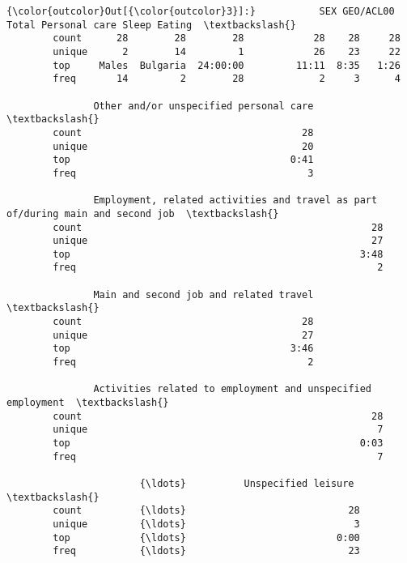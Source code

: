 \documentclass[11pt]{article}
\begin{document}
\begin{Verbatim}[commandchars=\\\{\}]
{\color{outcolor}Out[{\color{outcolor}3}]:}           SEX GEO/ACL00     Total Personal care Sleep Eating  \textbackslash{}
        count      28        28        28            28    28     28   
        unique      2        14         1            26    23     22   
        top     Males  Bulgaria  24:00:00         11:11  8:35   1:26   
        freq       14         2        28             2     3      4   
        
               Other and/or unspecified personal care  \textbackslash{}
        count                                      28   
        unique                                     20   
        top                                      0:41   
        freq                                        3   
        
               Employment, related activities and travel as part of/during main and second job  \textbackslash{}
        count                                                  28                                
        unique                                                 27                                
        top                                                  3:48                                
        freq                                                    2                                
        
               Main and second job and related travel  \textbackslash{}
        count                                      28   
        unique                                     27   
        top                                      3:46   
        freq                                        2   
        
               Activities related to employment and unspecified employment  \textbackslash{}
        count                                                  28            
        unique                                                  7            
        top                                                  0:03            
        freq                                                    7            
        
                       {\ldots}          Unspecified leisure   \textbackslash{}
        count          {\ldots}                            28   
        unique         {\ldots}                             3   
        top            {\ldots}                          0:00   
        freq           {\ldots}                            23   
        

\end{Verbatim}
\end{document}
